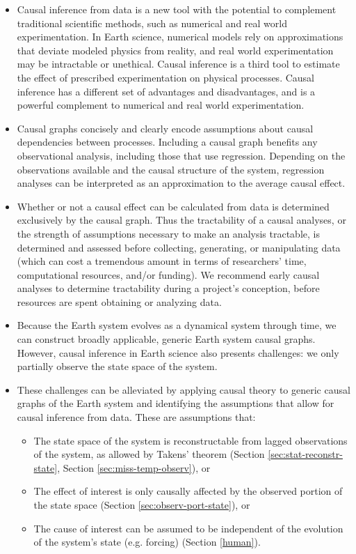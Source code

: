 \documentclass[12pt]{article}
\begin{document}
\begin{itemize}
\item Causal inference from data is a new tool with the potential to
  complement traditional scientific methods, such as numerical and
  real world experimentation. In Earth science, numerical models rely
  on approximations that deviate modeled physics from reality, and
  real world experimentation may be intractable or unethical. Causal
  inference is a third tool to estimate the effect of prescribed
  experimentation on physical processes. Causal inference has a
  different set of advantages and disadvantages, and is a powerful
  complement to numerical and real world experimentation.
\item Causal graphs concisely and clearly encode assumptions about
  causal dependencies between processes. Including a causal graph
  benefits any observational analysis, including those that use
  regression. Depending on the observations available and the causal
  structure of the system, regression analyses can be interpreted as
  an approximation to the average causal effect.
\item Whether or not a causal effect can be calculated from data is
  determined exclusively by the causal graph. Thus the tractability of
  a causal analyses, or the strength of assumptions necessary to make
  an analysis tractable, is determined and assessed before collecting,
  generating, or manipulating data (which can cost a tremendous amount
  in terms of researchers' time, computational resources, and/or
  funding). We recommend early causal analyses to determine
  tractability during a project's conception, before resources are
  spent obtaining or analyzing data.
\item Because the Earth system evolves as a dynamical system through
  time, we can construct broadly applicable, generic Earth system
  causal graphs. However, causal inference in Earth science also
  presents challenges: we only partially observe the state space of
  the system.
\item These challenges can be alleviated by applying causal theory to
  generic causal graphs of the Earth system and identifying the
  assumptions that allow for causal inference from data. These are
  assumptions that:
  \begin{itemize}
  \item The state space of the system is reconstructable
    from lagged observations of the system, as allowed by
    Takens' theorem (Section \ref{sec:stat-reconstr-state}, Section \ref{sec:miss-temp-observ}), or
  \item The effect of interest is only causally
    affected by the observed portion of the state space (Section
    \ref{sec:observ-port-state}), or
  \item The cause of interest can be assumed to be independent of the
    evolution of the system's state (e.g. forcing) (Section
    \ref{human}).
  \end{itemize}
\end{itemize}
\end{document}

